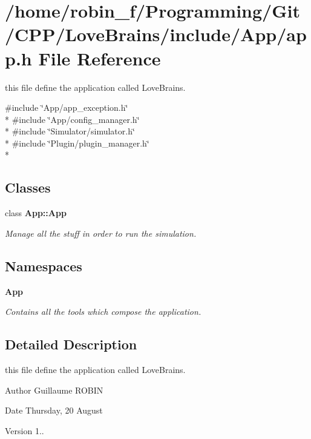 \section{/home/robin\+\_\+f/\+Programming/\+Git/\+C\+P\+P/\+Love\+Brains/include/\+App/app.h File Reference}
\label{app_8h}


this file define the application called Love\+Brains.  


{\ttfamily \#include \char`\"{}App/app\+\_\+exception.\+h\char`\"{}}\\*
{\ttfamily \#include \char`\"{}App/config\+\_\+manager.\+h\char`\"{}}\\*
{\ttfamily \#include \char`\"{}Simulator/simulator.\+h\char`\"{}}\\*
{\ttfamily \#include \char`\"{}Plugin/plugin\+\_\+manager.\+h\char`\"{}}\\*
\subsection*{Classes}
\begin{DoxyCompactItemize}
\item 
class {\bf App\+::\+App}
\begin{DoxyCompactList}\small\item\em Manage all the stuff in order to run the simulation. \end{DoxyCompactList}\end{DoxyCompactItemize}
\subsection*{Namespaces}
\begin{DoxyCompactItemize}
\item 
 {\bf App}
\begin{DoxyCompactList}\small\item\em Contains all the tools which compose the application. \end{DoxyCompactList}\end{DoxyCompactItemize}


\subsection{Detailed Description}
this file define the application called Love\+Brains. 

\begin{DoxyAuthor}{Author}
Guillaume R\+O\+B\+I\+N 
\end{DoxyAuthor}
\begin{DoxyDate}{Date}
Thursday, 20 August 
\end{DoxyDate}
\begin{DoxyVersion}{Version}
1.. 
\end{DoxyVersion}
